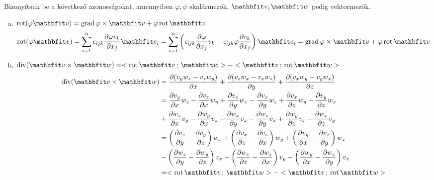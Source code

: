 \documentclass[exercise]{math-standalone}
\begin{document}
\begin{exercise}{%
    Bizonyítsuk be a következő azonosságokat, amennyiben $\varphi, \psi$
    skalármezők, $\rvec v, \rvec w$ pedig vektormezők.
  }
{\begin{enumerate}[a)]
      \item $\rot (\varphi \rvec v) = \grad \varphi \times \rvec v + \varphi \rot \rvec v$
            \[
              \rot (\varphi \rvec v)
              = \sum_{i = 1}^n \epsilon_{ijk} \pdv{\varphi v_k}{x_j} \rvec e_i
              = \sum_{i = 1}^n \left( \epsilon_{ijk} \pdv{\varphi}{x_j} v_k + \epsilon_{ijk} \varphi \pdv{v_k}{x_j} \right) \rvec e_i
              = \grad \varphi \times \rvec v + \varphi \rot \rvec v
            \]

      \item $\Div (\rvec v \times \rvec w) = \scalar{\rot \rvec v}{\rvec w} - \scalar{\rvec v}{\rot \rvec w}$
            \begin{align*}
              \Div (\rvec v \times \rvec w)
               & = \pdv{(v_y w_z - v_z w_y)}{x}
              + \pdv{(v_z w_x - v_x w_z)}{y}
              + \pdv{(v_x w_y - v_y w_x)}{z}
              \\
               & = \pdv{v_y}{x} w_z  - \pdv{v_z}{x} w_y
              + \pdv{v_z}{y} w_x  - \pdv{v_x}{y} w_z
              + \pdv{v_x}{z} w_y  - \pdv{v_y}{z} w_x
              \\
               & + \pdv{w_z}{x} v_y - \pdv{w_y}{x} v_z
              + \pdv{w_x}{y} v_z - \pdv{w_z}{y} v_x
              + \pdv{w_y}{z} v_x - \pdv{w_x}{z} v_y
              \\
               & = \left( \pdv{v_z}{y} - \pdv{v_y}{z} \right) w_x
              + \left( \pdv{v_x}{z} - \pdv{v_z}{x} \right) w_y
              + \left( \pdv{v_y}{x} - \pdv{v_x}{y} \right) w_z
              \\
               & - \left( \pdv{w_z}{y} - \pdv{w_y}{z} \right) v_x
              - \left( \pdv{w_x}{z} - \pdv{w_z}{x} \right) v_y
              - \left( \pdv{w_y}{x} - \pdv{w_x}{y} \right) v_z
              \\
               & = \scalar{\rot \rvec v}{\rvec w} - \scalar{\rvec v}{\rot \rvec w}
            \end{align*}
    \end{enumerate}
  }
\end{exercise}
\end{document}
